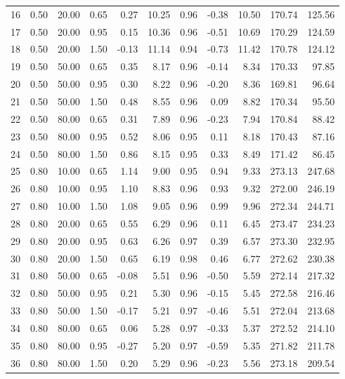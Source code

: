 \documentclass[useAMS, usenatbib, referee]{biom}\usepackage[]{graphicx}\usepackage[]{color}
\begin{document}
\begin{table}[ht]
{\begin{tabular}{rrrrrrrrrrr}
  16 & 0.50 & 20.00 & 0.65 & 0.27 & 10.25 & 0.96 & -0.38 & 10.50 & 170.74 & 125.56 \\ 
  17 & 0.50 & 20.00 & 0.95 & 0.15 & 10.36 & 0.96 & -0.51 & 10.69 & 170.29 & 124.59 \\ 
  18 & 0.50 & 20.00 & 1.50 & -0.13 & 11.14 & 0.94 & -0.73 & 11.42 & 170.78 & 124.12 \\ 
  19 & 0.50 & 50.00 & 0.65 & 0.35 & 8.17 & 0.96 & -0.14 & 8.34 & 170.33 & 97.85 \\ 
  20 & 0.50 & 50.00 & 0.95 & 0.30 & 8.22 & 0.96 & -0.20 & 8.36 & 169.81 & 96.64 \\ 
  21 & 0.50 & 50.00 & 1.50 & 0.48 & 8.55 & 0.96 & 0.09 & 8.82 & 170.34 & 95.50 \\ 
  22 & 0.50 & 80.00 & 0.65 & 0.31 & 7.89 & 0.96 & -0.23 & 7.94 & 170.84 & 88.42 \\ 
  23 & 0.50 & 80.00 & 0.95 & 0.52 & 8.06 & 0.95 & 0.11 & 8.18 & 170.43 & 87.16 \\ 
  24 & 0.50 & 80.00 & 1.50 & 0.86 & 8.15 & 0.95 & 0.33 & 8.49 & 171.42 & 86.45 \\ 
  25 & 0.80 & 10.00 & 0.65 & 1.14 & 9.00 & 0.95 & 0.94 & 9.33 & 273.13 & 247.68 \\ 
  26 & 0.80 & 10.00 & 0.95 & 1.10 & 8.83 & 0.96 & 0.93 & 9.32 & 272.00 & 246.19 \\ 
  27 & 0.80 & 10.00 & 1.50 & 1.08 & 9.05 & 0.96 & 0.99 & 9.96 & 272.34 & 244.71 \\ 
  28 & 0.80 & 20.00 & 0.65 & 0.55 & 6.29 & 0.96 & 0.11 & 6.45 & 273.47 & 234.23 \\ 
  29 & 0.80 & 20.00 & 0.95 & 0.63 & 6.26 & 0.97 & 0.39 & 6.57 & 273.30 & 232.95 \\ 
  30 & 0.80 & 20.00 & 1.50 & 0.65 & 6.19 & 0.98 & 0.46 & 6.77 & 272.62 & 230.38 \\ 
  31 & 0.80 & 50.00 & 0.65 & -0.08 & 5.51 & 0.96 & -0.50 & 5.59 & 272.14 & 217.32 \\ 
  32 & 0.80 & 50.00 & 0.95 & 0.21 & 5.30 & 0.96 & -0.15 & 5.45 & 272.58 & 216.46 \\ 
  33 & 0.80 & 50.00 & 1.50 & -0.17 & 5.21 & 0.97 & -0.46 & 5.51 & 272.04 & 213.68 \\ 
  34 & 0.80 & 80.00 & 0.65 & 0.06 & 5.28 & 0.97 & -0.33 & 5.37 & 272.52 & 214.10 \\ 
  35 & 0.80 & 80.00 & 0.95 & -0.27 & 5.20 & 0.97 & -0.59 & 5.35 & 271.82 & 211.78 \\ 
  36 & 0.80 & 80.00 & 1.50 & 0.20 & 5.29 & 0.96 & -0.23 & 5.56 & 273.18 & 209.54 \\ 
   \hline
\end{tabular}
}
\endgroup
\end{table}
\end{document}
